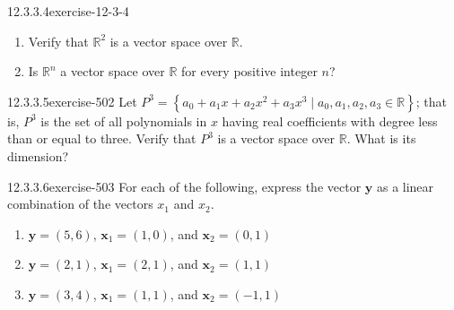 \documentclass[twoside,10pt,]{book}
\numberwithin{equation}{section}
\renewcommand{\vec}[1]{\mathbf{#1}}
\begin{document}
\begin{divisionsolution}{12.3.3.4}{}{exercise-12-3-4}%
\hypertarget{p-4525}{}%
\leavevmode%
\begin{enumerate}[label=(\alph*)]
\item\hypertarget{li-2070}{}\hypertarget{p-4526}{}%
Verify that \(\mathbb{R}^2\) is a vector space over \(\mathbb{R}\).%
\item\hypertarget{li-2071}{}\hypertarget{p-4527}{}%
Is \(\mathbb{R}^n\) a vector space over \(\mathbb{R}\) for every positive integer \(n\)?%
\end{enumerate}
%
\end{divisionsolution}%
\begin{divisionsolution}{12.3.3.5}{}{exercise-502}%
\hypertarget{p-4528}{}%
Let \(P^3= \left\{a_0 + a_1x + a_2x^2 + a_3x^3 \mid a_0,a_1,a_2,a_3\in \mathbb{R}\right\}\); that is, \(P^3\) is the set of all polynomials in \(x\) having real coefficients with degree less than or equal to three. Verify that \(P^3\) is a vector space over \(\mathbb{R}\). What is its dimension?%
\end{divisionsolution}%
\begin{divisionsolution}{12.3.3.6}{}{exercise-503}%
\hypertarget{p-4529}{}%
For each of the following, express the vector \(\pmb{y}\) as a linear combination of the vectors \(x_1\) and \(x_2\).\leavevmode%
\begin{enumerate}[label=(\alph*)]
\item\hypertarget{li-2072}{}\hypertarget{p-4530}{}%
\(\vec{y} = (5, 6)\),  \(\vec{x}_1 =(1, 0)\), and \(\vec{x}_2 = (0, 1)\)%
\item\hypertarget{li-2073}{}\hypertarget{p-4531}{}%
\(\vec{y} = (2, 1)\),  \(\vec{x}_1 =(2, 1)\), and  \(\vec{x}_2 = (1, 1)\)%
\item\hypertarget{li-2074}{}\hypertarget{p-4532}{}%
\(\vec{y} = (3,4)\),   \(\vec{x}_1 = (1, 1)\), and  \(\vec{x}_2 = (-1, 1)\)%
\end{enumerate}
%
\end{divisionsolution}%
\end{document}
